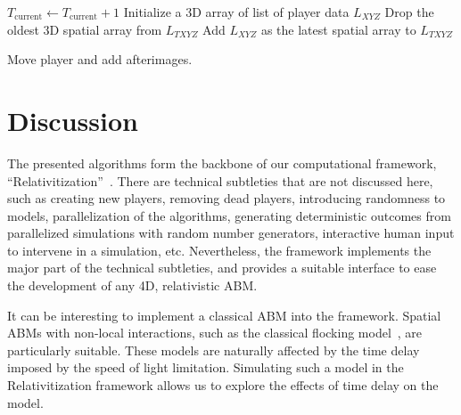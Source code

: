 \documentclass{svproc}
\begin{document}
\begin{algorithm}

$T_{\textrm{current}} \gets T_{\textrm{current}} + 1$\;
Initialize a 3D array of list of player data $L_{XYZ}$\;
Drop the oldest 3D spatial array from $L_{TXYZ}$\;
Add $L_{XYZ}$ as the latest spatial array to $L_{TXYZ}$\;

\caption{Move player and add afterimages.}
\label{alg:move}
\end{algorithm}

\section{Discussion}

The presented algorithms form the backbone of our computational framework, 
``Relativitization''~\cite{relativitization}.
There are technical subtleties that are not discussed here,
such as creating new players, removing dead players,
introducing randomness to models, parallelization of the algorithms, 
generating deterministic outcomes from parallelized simulations with random number generators,
interactive human input to intervene in a simulation, etc.
Nevertheless, the framework implements the major part of the technical subtleties, 
and provides a suitable interface to ease the development of any 4D, relativistic ABM.

It can be interesting to implement a classical ABM into the framework. 
Spatial ABMs with non-local interactions, 
such as the classical flocking model~\cite{reynolds1987flocks},
are particularly suitable.
These models are naturally affected by the time delay
imposed by the speed of light limitation.
Simulating such a model in the Relativitization framework allows us to explore the effects of time delay on the model.
\end{document}
